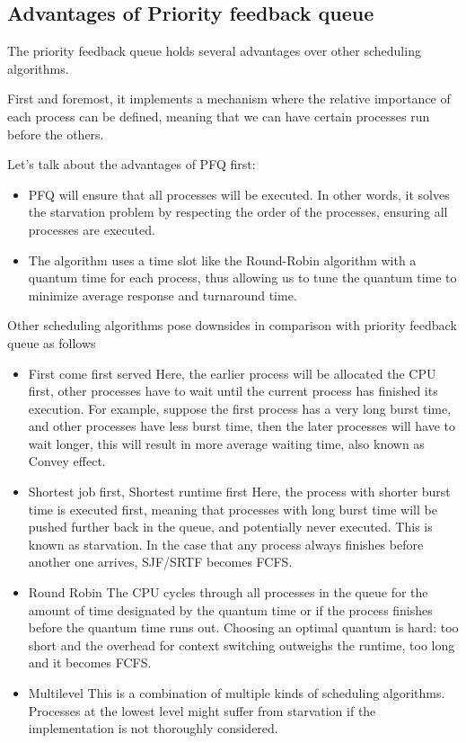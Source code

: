 \documentclass[a4paper]{article}
\numberwithin{equation}{section}
\begin{document}
\subsection{Advantages of Priority feedback queue}
The priority feedback queue holds several advantages over other scheduling algorithms.

First and foremost, it implements a mechanism where the relative importance of each process can be defined, meaning that we can have certain processes run before the others.

Let's talk about the advantages of PFQ first:
\begin{itemize}
  \item PFQ will ensure that all processes will be executed.
        In other words, it solves the starvation problem by respecting the order of the processes, ensuring all processes are executed.
  \item The algorithm uses a time slot like the Round-Robin algorithm with a quantum time for each process, thus allowing us to tune the quantum time to minimize average response and turnaround time.
\end{itemize}

Other scheduling algorithms pose downsides in comparison with priority feedback queue as follows
\begin{itemize}
  \item First come first served
        Here, the earlier process will be allocated the CPU first, other processes have to wait until the current process has finished its execution.
        For example, suppose the first process has a very long burst time, and other processes have less burst time, then the later processes will have to wait longer, this will result in more average waiting time, also known as Convey effect.

  \item Shortest job first, Shortest runtime first
        Here, the process with shorter burst time is executed first, meaning that processes with long burst time will be pushed further back in the queue, and potentially never executed.
        This is known as starvation.
        In the case that any process always finishes before another one arrives, SJF/SRTF becomes FCFS.\

  \item Round Robin
        The CPU cycles through all processes in the queue for the amount of time designated by the quantum time or if the process finishes before the quantum time runs out.
        Choosing an optimal quantum is hard: too short and the overhead for context switching outweighs the runtime, too long and it becomes FCFS.\

  \item Multilevel
        This is a combination of multiple kinds of scheduling algorithms.
        Processes at the lowest level might suffer from starvation if the implementation is not thoroughly considered.
\end{itemize}
\end{document}
